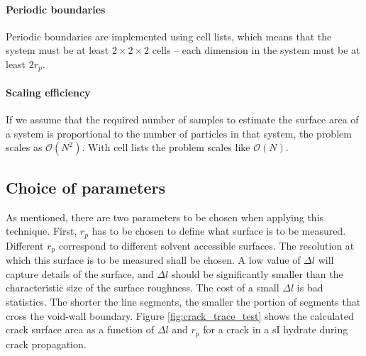 \paragraph{Periodic boundaries}
Periodic boundaries are implemented using cell lists, which means that the system must be at least $2\times 2 \times 2$ cells – each dimension in the system must be at least $2r_p$.
\paragraph{Scaling efficiency}
If we assume that the required number of samples to estimate the surface area of a system is proportional to the number of particles in that system, the problem scales as $\mathcal{O}(N^2)$. With cell lists the problem scales like $\mathcal{O}(N)$.

\subsection{Choice of parameters}
As mentioned, there are two parameters to be chosen when applying this technique. First, $r_p$ has to be chosen to define what surface is to be measured. Different $r_p$ correspond to different solvent accessible surfaces. The resolution at which this surface is to be measured shall be chosen. A low value of $\Delta l$ will capture details of the surface, and $\Delta l$ should be significantly smaller than the characteristic size of the surface roughness. The cost of a small $\Delta l$ is bad statistics. The shorter the line segments, the smaller the portion of segments that cross the void-wall boundary. Figure \ref{fig:crack_trace_test} shows the calculated crack surface area as a function of $\Delta l$ and $r_p$ for a crack in a sI hydrate during crack propagation. 

